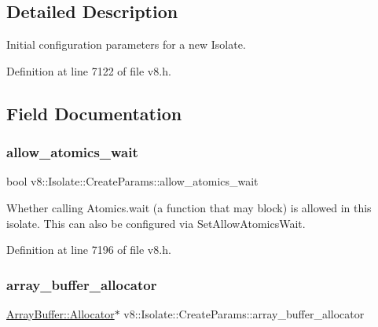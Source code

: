 \subsection{Detailed Description}
Initial configuration parameters for a new Isolate. 

Definition at line 7122 of file v8.\+h.



\subsection{Field Documentation}
\mbox{\label{structv8_1_1Isolate_1_1CreateParams_acade19de0f78ff15d76aaef2e292da72}} 
\subsubsection{\texorpdfstring{allow\+\_\+atomics\+\_\+wait}{allow\_atomics\_wait}}
{\footnotesize\ttfamily bool v8\+::\+Isolate\+::\+Create\+Params\+::allow\+\_\+atomics\+\_\+wait}

Whether calling Atomics.\+wait (a function that may block) is allowed in this isolate. This can also be configured via Set\+Allow\+Atomics\+Wait. 

Definition at line 7196 of file v8.\+h.

\mbox{\label{structv8_1_1Isolate_1_1CreateParams_a7c663f70b64290392eeaf164f57585f9}} 
\subsubsection{\texorpdfstring{array\+\_\+buffer\+\_\+allocator}{array\_buffer\_allocator}}
{\footnotesize\ttfamily \mbox{\hyperlink{classv8_1_1ArrayBuffer_1_1Allocator}{Array\+Buffer\+::\+Allocator}}$\ast$ v8\+::\+Isolate\+::\+Create\+Params\+::array\+\_\+buffer\+\_\+allocator}

